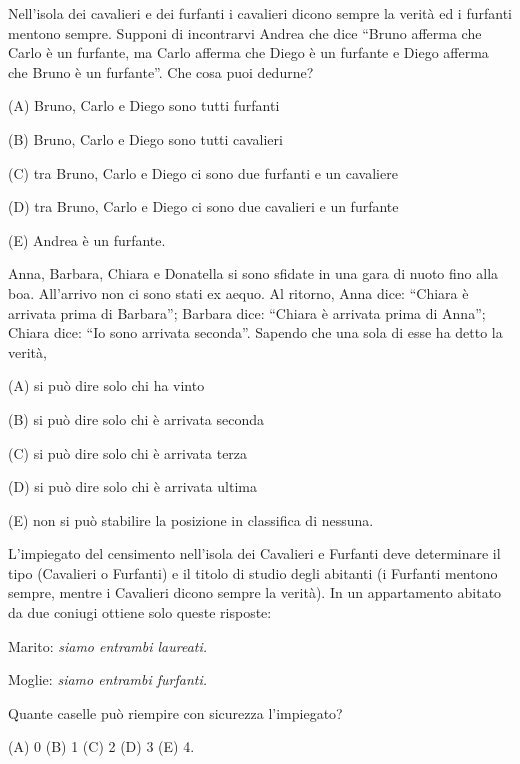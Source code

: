 \begin{esercizio}
    \label{ex:archimede_1999_triennio_238}
    Nell’isola dei cavalieri e dei furfanti i cavalieri dicono sempre la verità ed i furfanti mentono sempre.
    Supponi di incontrarvi Andrea che dice “Bruno afferma che Carlo è un furfante,
    ma Carlo afferma che Diego è un furfante e Diego afferma che Bruno è un furfante”.
    Che cosa puoi dedurne?

    (A) Bruno, Carlo e Diego sono tutti furfanti

    (B) Bruno, Carlo e Diego sono tutti cavalieri

    (C) tra Bruno, Carlo e Diego ci sono due furfanti e un cavaliere

    (D) tra Bruno, Carlo e Diego ci sono due cavalieri e un furfante

    (E) Andrea è un furfante.
\end{esercizio}

\begin{esercizio}
    \label{ex:archimede_2000_biennio_18}

    Anna, Barbara, Chiara e Donatella si sono sfidate in una gara di nuoto fino alla boa.
    All’arrivo non ci sono stati ex aequo.
    Al ritorno, Anna dice: “Chiara è arrivata prima di Barbara”;
    Barbara dice: “Chiara è arrivata prima di Anna”;
    Chiara dice: “Io sono arrivata seconda”.
    Sapendo che una sola di esse ha detto la verità,

    (A) si può dire solo chi ha vinto

    (B) si può dire solo chi è arrivata seconda

    (C) si può dire solo chi è arrivata terza

    (D) si può dire solo chi è arrivata ultima

    (E) non si può stabilire la posizione in classifica di nessuna.
\end{esercizio}

\begin{esercizio}
    \label{ex:archimede_2001_biennio_10}
    L’impiegato del censimento nell’isola dei Cavalieri e Furfanti deve determinare il tipo (Cavalieri o Furfanti) e il
    titolo di studio degli abitanti (i Furfanti mentono sempre, mentre i Cavalieri dicono sempre la verità).
    In un appartamento abitato da due coniugi ottiene solo queste risposte:

    Marito: \emph{siamo entrambi laureati.}

    Moglie: \emph{siamo entrambi furfanti.}

    Quante caselle può riempire con sicurezza l’impiegato?

    (A) 0 \quad (B) 1 \quad (C) 2 \quad (D) 3 \quad (E) 4.
\end{esercizio}

